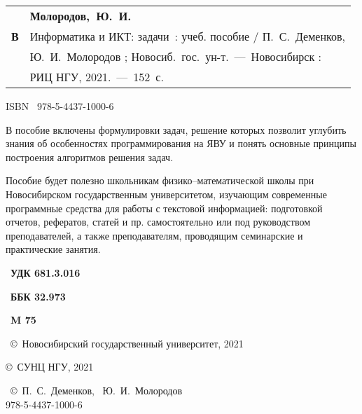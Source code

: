 \noindent


\vspace{2mm}

\noindent
\begin{tabular}{ll}

& \hspace{-3mm}\bf Молородов,~Ю.~И. \\

\hspace{-3mm}\bf В\;752  & \hspace{-3mm}Информатика и ИКТ: {задачи}~: учеб. пособие / П.~С.~Деменков, \\

&\hspace{-3mm}Ю.~И.~Молородов ; Новосиб.~гос.~ун-т.~---~Новосибирск :  \\

& \hspace{-3mm}РИЦ НГУ, 2021.~---~152~с.
\end{tabular}



\vspace{5mm}
\noindent  ISBN \ 978-5-4437-1000-6 \vspace{8mm}

В пособие включены формулировки задач, решение которых позволит углубить знания об особенностях программирования на ЯВУ и понять основные принципы построения алгоритмов решения задач.

Пособие будет полезно школьникам физико--математической школы при Новосибирском государственным университетом, изучающим современные программные средства для работы с текстовой информацией:  подготовкой отчетов, рефератов, статей и пр. самостоятельно или под руководством преподавателей, а также преподавателям, проводящим семинарские и практические занятия.


\vspace{3mm}

\noindent   \hfill~{\bf УДК 681.3.016}

\noindent   \hfill~{\bf ББК 32.973}

\noindent   \hfill~{\bf M 75}

\noindent   {}

\vspace{3mm}

\noindent \hspace*{-15pt} \hfill~\copyright~Новосибирский государственный университет, 2021

\noindent\hspace*{45pt}\copyright~СУНЦ НГУ, 2021

\noindent \hspace{130pt} ~\copyright~П.~С.~Деменков, ~Ю.~И.~Молородов  \\



\hspace*{-350pt}{ISBN}  978-5-4437-1000-6


